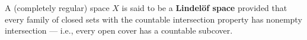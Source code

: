 A (completely regular) space $X$ is said to be a \textbf{Lindel\"of space} provided that every family of closed sets with the countable intersection property has nonempty intersection --- i.e., every open cover has a countable subcover.
